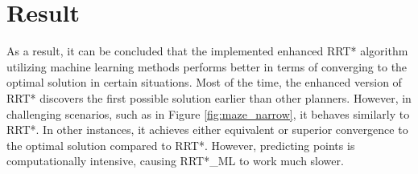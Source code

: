\documentclass{ctuthesis}
\begin{document}
\section{Result}
As a result, 
it can be concluded that the implemented enhanced RRT* algorithm utilizing machine learning methods 
performs better in terms of converging to the optimal solution in certain situations. 
Most of the time, the enhanced version of RRT* discovers the first possible solution earlier 
than other planners. 
However, in challenging scenarios, such as in Figure \ref{fig:maze_narrow}, 
it behaves similarly to RRT*. 
In other instances, 
it achieves either equivalent or superior convergence to the optimal solution compared to RRT*.
However, predicting points is computationally intensive, causing RRT*\_ML to work much slower.
\end{document}
